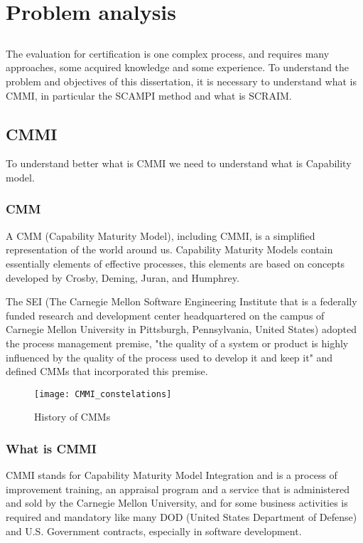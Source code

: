\chapter{Problem analysis} \label{chap:problem}

\section*{}

The evaluation for certification is one complex process, and requires many approaches, some acquired knowledge and some experience. To understand the problem and objectives of this dissertation, it is necessary to understand what is CMMI, in particular the SCAMPI method and what is SCRAIM.

\section{CMMI}

To understand better what is CMMI we need to understand what is Capability model.

\subsection{CMM}
A CMM (Capability Maturity Model), including CMMI, is a simplified representation of the world around us. Capability Maturity Models contain essentially elements of effective processes, this elements are based on concepts developed by Crosby, Deming, Juran, and Humphrey.

The SEI (The Carnegie Mellon Software Engineering Institute that is a federally funded research and development center headquartered on the campus of Carnegie Mellon University in Pittsburgh, Pennsylvania, United States) adopted the process management premise, "the quality of a system or product is highly influenced by the quality of the process used to develop it and keep it" and defined CMMs that incorporated this premise.
\begin{figure}[h]
	\begin{center}
		\leavevmode
		\texttt{[image: CMMI\_constelations]}
		\caption{History of CMMs}
		\label{fig:historycmmi}
	\end{center}
\end{figure}

\subsection{What is CMMI}
CMMI stands for Capability Maturity Model Integration and is a process of improvement training, an appraisal program and a service that is administered and sold by the Carnegie Mellon University, and for some business activities is required and mandatory like many DOD (United States Department of Defense) and U.S. Government contracts, especially in software development.


